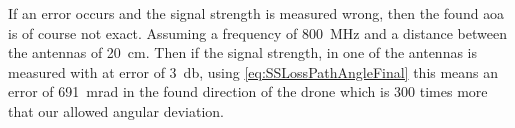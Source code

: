 If an error occurs and the signal strength is measured wrong, then the found \gls{aoa} is of course not exact.  Assuming a frequency of \SI{800}{\mega\hertz} and a distance between the antennas of \SI{20}{\centi\meter}. Then if the signal strength, in one of the antennas is measured with at error of \SI{3}{\decibel}, using \autoref{eq:SSLossPathAngleFinal} this means an error of \SI{691}{\milli\radian} in the found direction of the drone which is 300 times more that our allowed angular deviation. 

